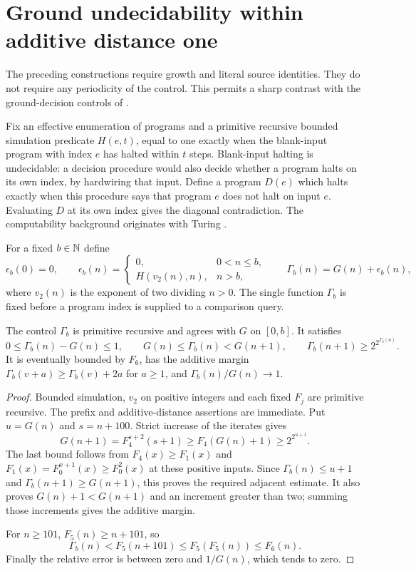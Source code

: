 \section{Ground undecidability within additive distance one}
\label{sec:control-hardness}

The preceding constructions require growth and literal source identities.
They do not require any periodicity of the control. This permits a sharp
contrast with the ground-decision controls of \cite{groundcomparison}.

Fix an effective enumeration of programs and a primitive recursive
bounded simulation predicate $H(e,t)$, equal to one exactly when the
blank-input program with index $e$ has halted within $t$ steps.
Blank-input halting is undecidable: a decision procedure would also
decide whether a program halts on its own index, by hardwiring that
input. Define a program $D(e)$ which halts exactly when this procedure
says that program $e$ does not halt on input $e$. Evaluating $D$ at
its own index gives the diagonal contradiction. The
computability background originates with Turing \cite{turing}.

For a fixed $b\in\mathbb N$ define
\[
 \epsilon_b(0)=0,\qquad
 \epsilon_b(n)=\begin{cases}
 0,&0<n\le b,\\ H(v_2(n),n),&n>b,
 \end{cases}
 \qquad \Gamma_b(n)=G(n)+\epsilon_b(n),
\]
where $v_2(n)$ is the exponent of two dividing $n>0$.
The single function $\Gamma_b$ is fixed before a program index is
supplied to a comparison query.

\begin{lemma}
\label{lem:perturbed-control}
The control $\Gamma_b$ is primitive recursive and agrees with $G$
on $[0,b]$. It satisfies
\[
 0\le\Gamma_b(n)-G(n)\le1,\qquad
 G(n)\le\Gamma_b(n)<G(n+1),\qquad
 \Gamma_b(n+1)\ge2^{2^{\Gamma_b(n)}}.
\]
It is eventually bounded by $F_6$, has the additive margin
$\Gamma_b(v+a)\ge\Gamma_b(v)+2a$ for $a\ge1$, and
$\Gamma_b(n)/G(n)\longrightarrow1$.
\end{lemma}
\begin{proof}
Bounded simulation, $v_2$ on positive integers and each fixed $F_j$
are primitive recursive. The prefix and additive-distance assertions
are immediate. Put $u=G(n)$ and $s=n+100$. Strict increase of the
iterates gives
\[
 G(n+1)=F_4^{s+2}(s+1)
       \ge F_4(G(n)+1)\ge2^{2^{u+1}}.
\]
The last bound follows from $F_4(x)\ge F_1(x)$ and
$F_1(x)=F_0^{x+1}(x)\ge F_0^2(x)$ at these positive inputs.
Since $\Gamma_b(n)\le u+1$ and $\Gamma_b(n+1)\ge G(n+1)$,
this proves the required adjacent estimate. It also proves
$G(n)+1<G(n+1)$ and an increment greater than two; summing those
increments gives the additive margin.

For $n\ge101$, $F_5(n)\ge n+101$, so
\[
 \Gamma_b(n)<F_5(n+101)\le F_5(F_5(n))\le F_6(n).
\]
Finally the relative error is between zero and $1/G(n)$, which
tends to zero.
\end{proof}

